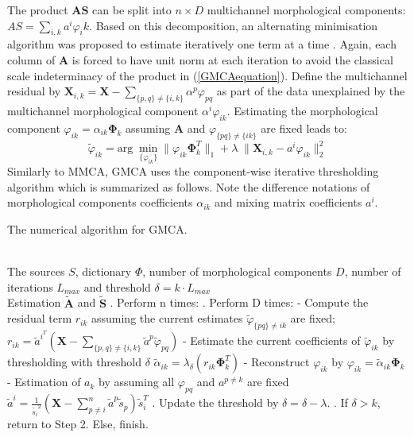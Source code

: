 The product $\mathbf{AS}$ can be split into $n\times D$ multichannel morphological components: $AS = \sum_{i,k}a^i\varphi_ik$. Based on this decomposition, an alternating minimisation algorithm was proposed to estimate iteratively one term at a time \cite{BobinJ_2007SaMD}. Again, each column of $\mathbf{A}$ is forced to have unit norm at each iteration to avoid the classical scale indeterminacy of the product in (\ref{GMCAequation}). Define the multichannel residual by $\mathbf{X}_{i,k} = \mathbf{X} - \sum_{\{p,q\}\neq \{i,k\}} \alpha^p \varphi_{pq}$ as part of the data unexplained by the multichannel morphological component $\alpha^i \varphi_{ik}$. Estimating the morphological component $\varphi_{ik} = \alpha_{ik}\mathbf{\Phi}_k$ assuming $\mathbf{A}$ and $\varphi_{\{pq\} \neq \{ik\}}$ are fixed leads to: 
\begin{equation}
    \tilde{\varphi}_{ik} = \text{arg} \; \min_{\{\varphi_{ik}\}} \lVert \varphi_{ik}\mathbf{\Phi}_k^T\rVert_{1} + \lambda \; \lVert \mathbf{X}_{i,k} - a^i\varphi_{ik}\rVert_2^2
\end{equation}
Similarly to MMCA, GMCA uses the component-wise iterative thresholding algorithm which is summarized as follows. Note the difference notations of morphological components coefficients $\alpha_{ik}$ and mixing matrix coefficients $a^i$.\\

\begin{algorithm}[!htbp] 
\caption{ The numerical algorithm for GMCA.} 
\label{algFramwork3} 
\begin{algorithmic}
\REQUIRE ~~\\%
The sources $S$, dictionary $\Phi$, number of morphological components $D$, number of iterations $L_{max}$ and threshold $\delta = k \cdot L_{max}$
\ENSURE ~~\\ %
Estimation $\tilde{\mathbf{A}}$ and $\tilde{\mathbf{S}}$
. Perform n times:
\STATE {}. Perform D times:
\STATE \qquad \quad - Compute the residual term $r_{ik}$ assuming the current estimates $\tilde{\varphi}_{\{pq\} \neq ik}$ are fixed; 
\STATE \qquad \quad $r_{ik} = \tilde{a}^i^T(\mathbf{X} - \sum_{\{p,q\} \neq \{i,k\}} \tilde{a}^p \tilde{\varphi}_{pq}) $
\STATE \qquad \quad - Estimate the current coefficients of $\tilde{\varphi}_{ik}$ by thresholding with threshold $\delta$
\STATE \qquad \quad $\tilde{\alpha}_{ik} = \lambda_{\delta}(r_{ik}\mathbf{\Phi}_k^T)$
\STATE \qquad \quad - Reconstruct $\varphi_{ik}$ by $\varphi_{ik} = \tilde{\alpha}_{ik} \mathbf{\Phi}_k$
\STATE \qquad \quad - Estimation of $a_k$ by assuming all $\varphi_{pq}$ and $a^{p \neq k}$ are fixed 
\STATE \qquad \quad $\tilde{a}^i = \frac{1}{\tilde{s_i}^2}(\mathbf{X} - \sum_{p\neq i}^n \tilde{a}^p\tilde{s}_p)\tilde{s}_i^T$
. Update the threshold by $\delta = \delta - \lambda$.
. If $\delta>k $, return to Step 2. Else, finish.
\end{algorithmic}
\end{algorithm}


